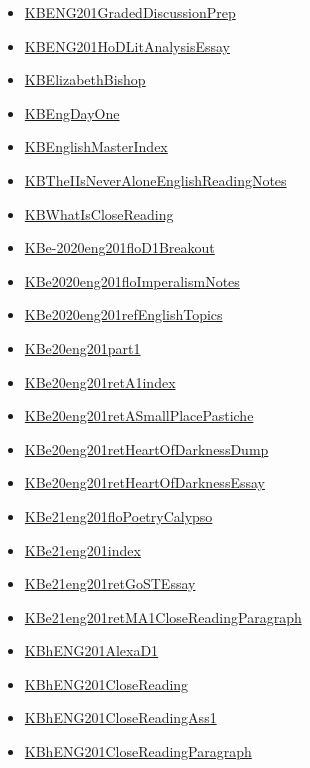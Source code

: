 \documentclass[11pt]{article}
\begin{document}
\begin{itemize}
\begin{itemize}
\item \href{eng201/KBENG201GradedDiscussionPrep.org}{KBENG201GradedDiscussionPrep}
\item \href{eng201/KBENG201HoDLitAnalysisEssay.org}{KBENG201HoDLitAnalysisEssay}
\item \href{eng201/KBElizabethBishop.org}{KBElizabethBishop}
\item \href{eng201/KBEngDayOne.org}{KBEngDayOne}
\item \href{eng201/KBEnglishMasterIndex.org}{KBEnglishMasterIndex}
\item \href{eng201/KBTheIIsNeverAloneEnglishReadingNotes.org}{KBTheIIsNeverAloneEnglishReadingNotes}
\item \href{eng201/KBWhatIsCloseReading.org}{KBWhatIsCloseReading}
\item \href{eng201/KBe-2020eng201floD1Breakout.org}{KBe-2020eng201floD1Breakout}
\item \href{eng201/KBe2020eng201floImperalismNotes.org}{KBe2020eng201floImperalismNotes}
\item \href{eng201/KBe2020eng201refEnglishTopics.org}{KBe2020eng201refEnglishTopics}
\item \href{eng201/KBe20eng201part1.org}{KBe20eng201part1}
\item \href{eng201/KBe20eng201retA1index.org}{KBe20eng201retA1index}
\item \href{eng201/KBe20eng201retASmallPlacePastiche.org}{KBe20eng201retASmallPlacePastiche}
\item \href{eng201/KBe20eng201retHeartOfDarknessDump.org}{KBe20eng201retHeartOfDarknessDump}
\item \href{eng201/KBe20eng201retHeartOfDarknessEssay.org}{KBe20eng201retHeartOfDarknessEssay}
\item \href{eng201/KBe21eng201floPoetryCalypso.org}{KBe21eng201floPoetryCalypso}
\item \href{eng201/KBe21eng201index.org}{KBe21eng201index}
\item \href{eng201/KBe21eng201retGoSTEssay.org}{KBe21eng201retGoSTEssay}
\item \href{eng201/KBe21eng201retMA1CloseReadingParagraph.org}{KBe21eng201retMA1CloseReadingParagraph}
\item \href{eng201/KBhENG201AlexaD1.org}{KBhENG201AlexaD1}
\item \href{eng201/KBhENG201CloseReading.org}{KBhENG201CloseReading}
\item \href{eng201/KBhENG201CloseReadingAss1.org}{KBhENG201CloseReadingAss1}
\item \href{eng201/KBhENG201CloseReadingParagraph.org}{KBhENG201CloseReadingParagraph}

\end{itemize}
\end{itemize}
\end{document}
